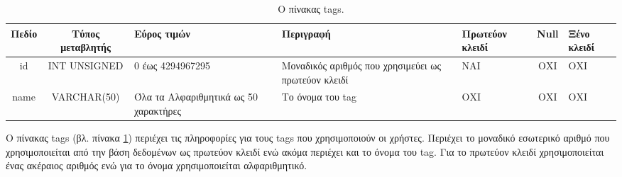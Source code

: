 \documentclass{assignment}
\begin{document}
\begin{landscape}
\begin{table}[htbp]
\begin{center}
  \begin{tabular}{|c|c|m{}|m{}|m{2.0cm}|c|m{1.5cm}|}
    \hline
    {\bf Πεδίο} & {\bf Τύπος μεταβλητής} & {\bf Εύρος τιμών} & {\bf Περιγραφή} & {\bf Πρωτεύον κλειδί} & {\bf Null} & {\bf Ξένο κλειδί} \\ \hline
    id & INT UNSIGNED & 0 έως 4294967295 & Μοναδικός αριθμός που χρησιμεύει ως πρωτεύον κλειδί & ΝΑΙ & ΟΧΙ & ΟΧΙ \\ \hline
    name & VARCHAR(50) & Όλα τα Αλφαριθμητικά ως 50 χαρακτήρες & Το όνομα του tag & ΟΧΙ & ΟΧΙ & ΟΧΙ \\ \hline
  \end{tabular}
\caption{Ο πίνακας tags.}
\label{table:db_table:tags}
\end{center}
\end{table}

Ο πίνακας tags (βλ. πίνακα \ref{table:db_table:tags}) περιέχει τις πληροφορίες για τους tags που χρησιμοποιούν οι χρήστες. Περιέχει το μοναδικό εσωτερικό αριθμό που χρησιμοποιείται από την βάση δεδομένων ως πρωτεύον κλειδί ενώ ακόμα περιέχει και το όνομα του tag. Για το πρωτεύον κλειδί χρησιμοποιείται ένας ακέραιος αριθμός ενώ για το όνομα χρησιμοποιείται αλφαριθμητικό. \\
\end{landscape}
\end{document}
